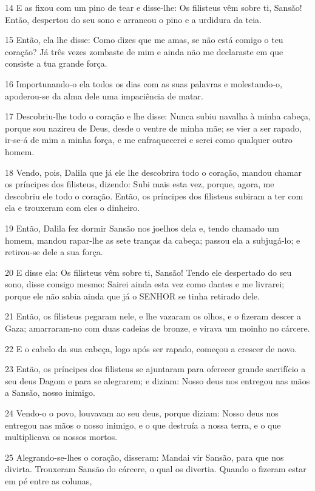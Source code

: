 \par 14 E as fixou com um pino de tear e disse-lhe: Os filisteus vêm sobre ti, Sansão! Então, despertou do seu sono e arrancou o pino e a urdidura da teia.
\par 15 Então, ela lhe disse: Como dizes que me amas, se não está comigo o teu coração? Já três vezes zombaste de mim e ainda não me declaraste em que consiste a tua grande força.
\par 16 Importunando-o ela todos os dias com as suas palavras e molestando-o, apoderou-se da alma dele uma impaciência de matar.
\par 17 Descobriu-lhe todo o coração e lhe disse: Nunca subiu navalha à minha cabeça, porque sou nazireu de Deus, desde o ventre de minha mãe; se vier a ser rapado, ir-se-á de mim a minha força, e me enfraquecerei e serei como qualquer outro homem.
\par 18 Vendo, pois, Dalila que já ele lhe descobrira todo o coração, mandou chamar os príncipes dos filisteus, dizendo: Subi mais esta vez, porque, agora, me descobriu ele todo o coração. Então, os príncipes dos filisteus subiram a ter com ela e trouxeram com eles o dinheiro.
\par 19 Então, Dalila fez dormir Sansão nos joelhos dela e, tendo chamado um homem, mandou rapar-lhe as sete tranças da cabeça; passou ela a subjugá-lo; e retirou-se dele a sua força.
\par 20 E disse ela: Os filisteus vêm sobre ti, Sansão! Tendo ele despertado do seu sono, disse consigo mesmo: Sairei ainda esta vez como dantes e me livrarei; porque ele não sabia ainda que já o SENHOR se tinha retirado dele.
\par 21 Então, os filisteus pegaram nele, e lhe vazaram os olhos, e o fizeram descer a Gaza; amarraram-no com duas cadeias de bronze, e virava um moinho no cárcere.
\par 22 E o cabelo da sua cabeça, logo após ser rapado, começou a crescer de novo.
\par 23 Então, os príncipes dos filisteus se ajuntaram para oferecer grande sacrifício a seu deus Dagom e para se alegrarem; e diziam: Nosso deus nos entregou nas mãos a Sansão, nosso inimigo.
\par 24 Vendo-o o povo, louvavam ao seu deus, porque diziam: Nosso deus nos entregou nas mãos o nosso inimigo, e o que destruía a nossa terra, e o que multiplicava os nossos mortos.
\par 25 Alegrando-se-lhes o coração, disseram: Mandai vir Sansão, para que nos divirta. Trouxeram Sansão do cárcere, o qual os divertia. Quando o fizeram estar em pé entre as colunas,
